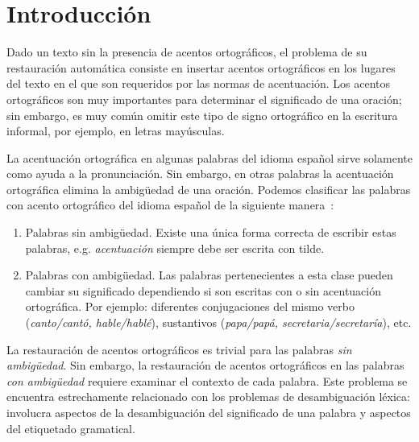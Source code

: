 \documentclass[runningheads,a4paper]{llncs}
\begin{document}
\section{Introducción}
Dado un texto sin la presencia de acentos ortográficos, el problema de su  restauración automática consiste en insertar acentos ortográficos en los lugares del texto en el que son requeridos por las normas de acentuación. Los acentos ortográficos son muy importantes para determinar el significado de una oración; sin embargo, es muy común omitir este tipo de signo ortográfico en la escritura informal, por ejemplo, en letras mayúsculas.

La acentuación ortográfica en algunas palabras del idioma español sirve solamente como ayuda a la pronunciación. Sin embargo, en otras palabras la acentuación ortográfica elimina la ambigüedad de una oración. Podemos clasificar las palabras con acento ortográfico del idioma español de la siguiente manera~\cite{CRANDALL95}:
\begin{enumerate}
\item{Palabras sin ambigüedad}. Existe una única forma correcta de escribir estas palabras, e.g. \emph{acentuación} siempre debe ser escrita con tilde.
\item{Palabras con ambigüedad}. Las palabras pertenecientes a esta clase pueden cambiar su significado dependiendo si son escritas con o sin acentuación ortográfica. Por ejemplo: diferentes conjugaciones del mismo verbo (\emph{canto/cantó, hable/hablé}), sustantivos (\emph{papa/papá, secretaria/secretaría}), etc.
\end{enumerate}

La restauración de acentos ortográficos es trivial para las palabras \emph{sin ambig\"uedad}. Sin embargo, la restauración de acentos ortográficos en las palabras \emph{con ambig\"uedad} requiere examinar el contexto de cada palabra. Este problema se encuentra estrechamente relacionado con los problemas de desambiguación léxica: involucra aspectos de la desambiguación del significado de una palabra y aspectos del etiquetado gramatical. 
\end{document}
